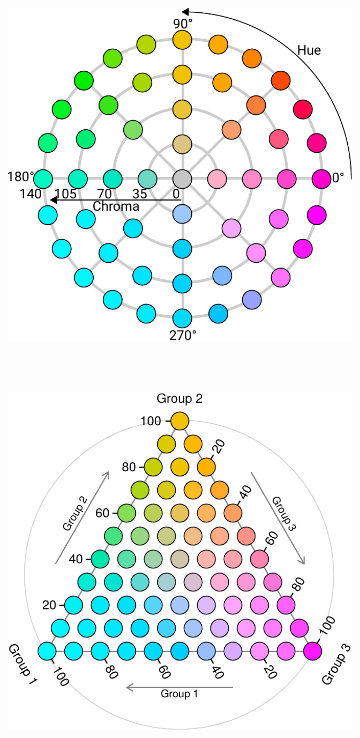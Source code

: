 \documentclass{scrartcl}
\begin{document}
\begin{appendix}
\begin{figure}[!htb]
  \begin{subfigure}[t]{0.3\textwidth}
  \centering
  \includegraphics[width = \textwidth]{../fig/cielch.pdf}
  \label{fig:cielch}
  \end{subfigure}%
  ~
  \begin{subfigure}[t]{0.3\textwidth}
  \includegraphics[width = \textwidth]{../fig/tern_exmpl.pdf}

\end{subfigure}
\end{figure}
\end{appendix}
\end{document}
